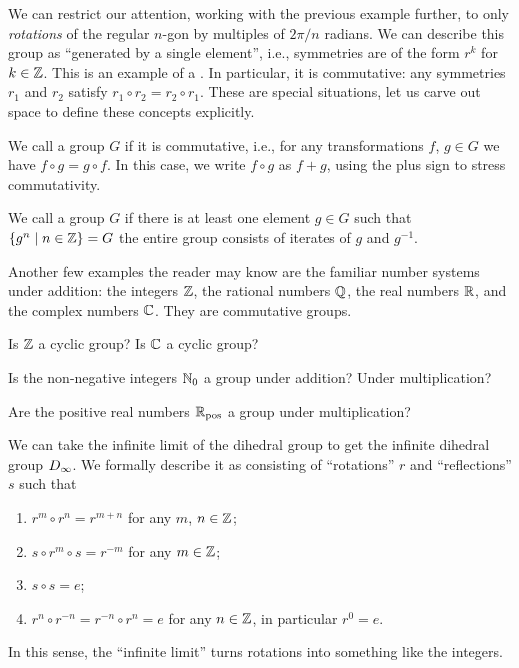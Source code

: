 \begin{example}
We can restrict our attention, working with the previous example
further, to only \emph{rotations} of the regular $n$-gon by multiples of
$2\pi/n$ radians. We can describe this group as ``generated by a single element'',
i.e., symmetries are of the form $r^{k}$ for $k\in\mathbb{Z}$. This is an
example of a . In particular, it is commutative:
any symmetries $r_{1}$ and $r_{2}$ satisfy $r_{1}\circ r_{2}=r_{2}\circ r_{1}$.
These are special situations, let us carve out space to define these
concepts explicitly.
\end{example}

\begin{definition}
  We call a group $G$  if it is commutative, i.e.,
  for any transformations $f$,
  $g\in G$ we have $f\circ g = g\circ f$. In this case, we write $f\circ g$
  as $f+g$, using the plus sign to stress commutativity.
\end{definition}

\begin{definition}
  We call a group $G$  if there is at least one element
  $g\in G$ such that $\{g^{n}\mid n\in\mathbb{Z}\}=G$ the entire group consists
  of iterates of $g$ and $g^{-1}$.
\end{definition}

\begin{example}
Another few examples the reader may know are the familiar number systems
under addition: the integers $\mathbb{Z}$, the rational numbers $\mathbb{Q}$, the real
numbers $\mathbb{R}$, and the complex numbers $\mathbb{C}$. They are commutative groups.
\end{example}

\begin{exercise}
 Is $\mathbb{Z}$ a cyclic group? Is $\mathbb{C}$ a cyclic group?
\end{exercise}
\begin{exercise}
  Is the non-negative integers $\mathbb{N}_{0}$ a group under addition? Under multiplication?
\end{exercise}
\begin{exercise}
  Are the positive real numbers $\mathbb{R}_{\text{pos}}$ a group under multiplication?
\end{exercise}

\begin{example}
We can take the infinite limit of the dihedral group to get the infinite
dihedral group $D_{\infty}$. We formally describe it as
consisting of ``rotations'' $r$ and ``reflections'' $s$ such that
\begin{enumerate}
\item $r^{m}\circ r^{n} = r^{m+n}$ for any $m$, $n\in\mathbb{Z}$;
\item $s\circ r^{m}\circ s = r^{-m}$ for any $m\in\mathbb{Z}$;
\item $s\circ s = e$;
\item $r^{n}\circ r^{-n} = r^{-n}\circ r^{n} = e$ for any $n\in\mathbb{Z}$, in
  particular $r^{0}=e$.
\end{enumerate}
In this sense, the ``infinite limit'' turns rotations into something
like the integers.
\end{example}

